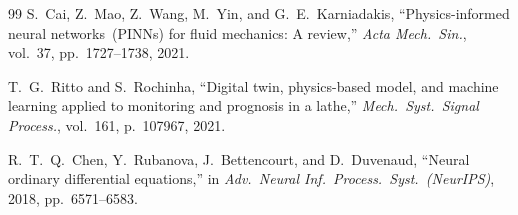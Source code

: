 \documentclass[journal,twocolumn]{IEEEtran}
\begin{document}
\begin{thebibliography}{99}
S.~Cai, Z.~Mao, Z.~Wang, M.~Yin, and G.~E.~Karniadakis,
``Physics-informed neural networks~(PINNs) for fluid mechanics: A review,''
\emph{Acta Mech.\ Sin.}, vol.~37, pp.~1727--1738, 2021.

T.~G.~Ritto and S.~Rochinha,
``Digital twin, physics-based model, and machine learning applied to monitoring
and prognosis in a lathe,''
\emph{Mech.\ Syst.\ Signal Process.}, vol.~161, p.~107967, 2021.

R.~T.~Q.~Chen, Y.~Rubanova, J.~Bettencourt, and D.~Duvenaud,
``Neural ordinary differential equations,''
in \emph{Adv.\ Neural Inf.\ Process.\ Syst.~(NeurIPS)}, 2018, pp.~6571--6583.

\end{thebibliography}
\end{document}

